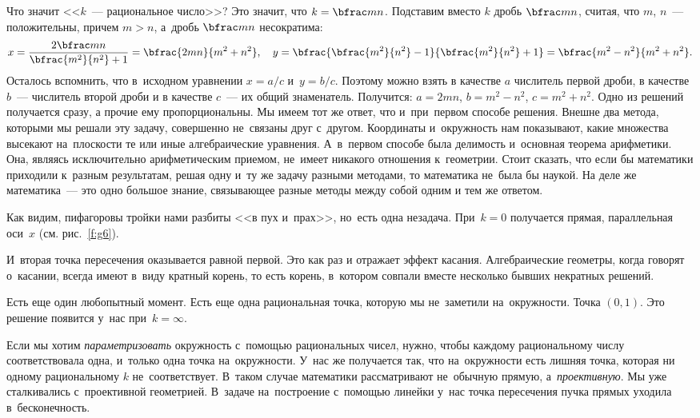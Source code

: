 Что значит <<$k$~--- рациональное число>>? Это значит, что $k=\bfrac mn$. Подставим вместо $k$ дробь $\bfrac mn$,
считая, что $m$, $n$~--- положительны, причем $m>n$, а~дробь $\bfrac mn$ несократима:
$$
x=\frac{2\bfrac mn}{\bfrac{m^{2}}{n^{2}}+1}=
\bfrac{2mn}{m^{2}+n^{2}},\quad
y=\bfrac{\bfrac{m^{2}}{n^{2}}-1}{\bfrac{m^{2}}{n^{2}}+1}=
\bfrac{m^{2}-n^{2}}{m^{2}+n^{2}}.
$$
Осталось вспомнить, что в~исходном уравнении $x=a/c$ и~$y=b/c$. Поэтому можно взять в качестве $a$ числитель первой дроби, в качестве $b$~--- числитель второй дроби и в качестве $c$~--- их общий знаменатель. Получится: $a=2mn$, $b=m^{2}-n^{2}$, $c=m^{2}+n^{2}$. Одно
из решений получается сразу, а прочие ему пропорциональны.
Мы имеем тот же ответ, что и~при~первом способе решения.
 Внешне два метода, которыми мы решали эту задачу,
совершенно не~связаны друг с~другом. Координаты и~окружность нам показывают, какие множества
высекают на~плоскости те или иные алгебраические уравнения. А~в~первом способе была делимость
и~основная теорема арифметики. Она, являясь исключительно
арифметическим приемом, не~имеет никакого отношения к~геометрии. Стоит сказать, что если бы математики приходили к~разным результатам, решая
одну и~ту же задачу разными методами, то математика не~была бы наукой. На деле же математика~--- это одно
большое знание, связывающее разные методы между собой одним и тем же ответом.

\pagebreak

Как видим, пифагоровы тройки нами разбиты <<в пух и~прах>>, но~есть одна незадача. При~$k=0$
получается прямая, параллельная оси~$x$ (см. рис.~\ref{f:g6}).


И~вторая точка пересечения оказывается равной первой. Это как раз и отражает эффект касания.
Алгебраические геометры, когда говорят о~касании, всегда имеют в~виду кратный корень, то есть
корень, в~котором совпали вместе несколько бывших некратных решений.

Есть еще один любопытный момент. Есть еще одна рациональная точка, которую мы не~заметили
на~окружности. Точка $(0,1)$. Это решение появится у~нас при~$k=\infty$.

Если мы хотим \textit{параметризовать} окружность с~помощью рациональных чисел, нужно, чтобы каждому
рациональному числу соответствовала одна, и~только одна точка на~окружности. У~нас же получается
так, что на~окружности есть лишняя точка, которая ни одному рациональному $k$ не~соответствует.
В~таком случае математики рассматривают не~обычную прямую, а~\textit{проективную}. Мы уже сталкивались
с~проективной геометрией. В~задаче на~построение с~помощью линейки у~нас точка пересечения пучка прямых уходила в~бесконечность.

